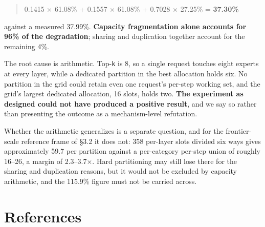\documentclass[
  10pt,
  letterpaper,
  10pt]{article}
\begin{document}
\begin{quote}
0.1415 \ensuremath{\times} 61.08\% + 0.1557 \ensuremath{\times} 61.08\%
+ 0.7028 \ensuremath{\times} 27.25\% = \textbf{37.30\%}
\end{quote}

against a measured 37.99\%. \textbf{Capacity fragmentation alone
accounts for 96\% of the degradation}; sharing and duplication together
account for the remaining 4\%.

The root cause is arithmetic. Top-\texttt{k} is 8, so a single request
touches eight experts at every layer, while a dedicated partition in the
best allocation holds six. No partition in the grid could retain even
one request's per-step working set, and the grid's largest dedicated
allocation, 16 slots, holds two. \textbf{The experiment as designed
could not have produced a positive result}, and we say so rather than
presenting the outcome as a mechanism-level refutation.

Whether the arithmetic generalizes is a separate question, and for the
frontier-scale reference frame of §3.2 it does not: 358 per-layer slots
divided six ways gives approximately 59.7 per partition against a
per-category per-step union of roughly 16--26, a margin of
2.3--3.7\ensuremath{\times}. Hard partitioning may still lose there for
the sharing and duplication reasons, but it would not be excluded by
capacity arithmetic, and the \textminus{}115.9\% figure must not be
carried across.

\section*{References}\label{bibliography}
\end{document}
